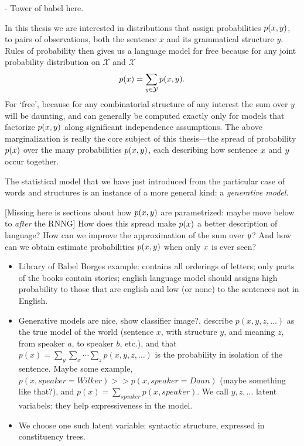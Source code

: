  - Tower of babel here.

  In this thesis we are interested in distributions that assign probabilities $p(x, y)$, to pairs of observations, both the sentence $x$ and its grammatical structure $y$. Rules of probability then gives us a language model for free because for any joint probability distribution on $\mathcal{X}$ and $\mathcal{X}$
  \begin{align*}
    p(x) = \sum_{y \in \mathcal{Y}} p(x, y).
  \end{align*}
  For `free', because for any combinatorial structure of any interest the sum over $y$ will be daunting, and can generally be computed exactly only for models that factorize $p(x, y)$ along significant independence assumptions. The above marginalization is really the core subject of this thesis---the spread of probability $p(x)$ over the many probabilities $p(x, y)$, each describing how sentence $x$ and $y$ occur together.

  The statistical model that we have just introduced from the particular case of words and structures is an instance of a more general kind: a \textit{generative model}.

  [Missing here is sections about how $p(x, y)$ are parametrized: maybe move below to \textit{after} the RNNG] How does this spread make $p(x)$ a better description of language? How can we improve the approximation of the sum over $y$? And how can we obtain estimate probabilities $p(x, y)$ when only $x$ is ever seen?


\begin{itemize}
  \item Library of Babel Borges example: contains all orderings of letters; only parts of the books contain stories; english language model should assigns high probability to those that are english and low (or none) to the sentences not in English.
  \item Generative models are nice, show classifier image?, describe $p(x, y, z, \dots)$ as the true model of the world (sentence $x$, with structure $y$, and meaning $z$, from speaker $a$, to speaker $b$, etc.), and that $p(x) = \sum_y \sum_x \cdots \sum_z p(x, y, z, \dots)$ is the probability in isolation of the sentence. Maybe some example, $p(x, speaker = Wilker) >> p(x, speaker = Daan)$ (maybe something like that?), and $p(x) = \sum_{speaker} p(x, speaker)$. We call $y, z, \dots$ latent variabels: they help expressiveness in the model.
  \item We choose one such latent variable: syntactic structure, expressed in constituency trees.
\end{itemize}

